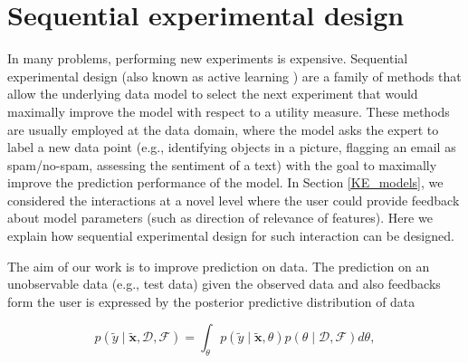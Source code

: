 \documentclass[dissertation,math,vertlayout,pdfa,colorlinks]{aaltoseries}
\newcommand{\bD}{\mathcal{D}}
\newcommand{\bF}{\mathcal{F}}
\begin{document}
\section{Sequential experimental design}\label{AL_and_ED}

In many problems, performing new experiments is expensive. Sequential experimental design \cite{chaloner1995,seeger2008bayesian,settles2010active} (also known as active learning \cite{settles2010active}) are a family of methods that allow the underlying data model to select the next experiment that would maximally improve the model with respect to a utility measure. These methods are usually employed at the data domain, where the model asks the expert to label a new data point (e.g., identifying objects in a picture, flagging an email as spam/no-spam, assessing the sentiment of a text) with the goal to maximally improve the prediction performance of the model. In Section \ref{KE_models}, we considered the interactions at a novel level where the user could provide feedback about model parameters (such as direction of relevance of features). Here we explain how sequential experimental design for such interaction can be designed.

The aim of our work is to improve prediction on data. The prediction on an unobservable data (e.g., test data) given the observed data and also feedbacks form the user is expressed by the posterior predictive distribution of data 

\begin{equation}\label{Eq:post_pred_data_fb}
p(\tilde{y} \mid \tilde{\bm{x}}, \bD,\bF) = \int_{\theta} p(\tilde{y}  \mid \tilde{\bm{x}}, \theta)p(\theta \mid \bD, \bF)d\theta,
\end{equation}
\end{document}
